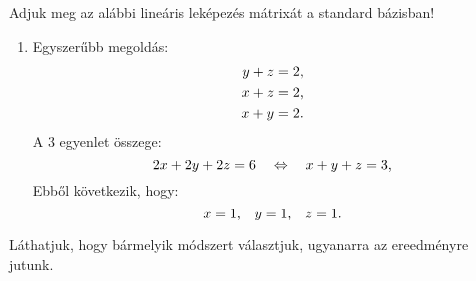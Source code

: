 \documentclass[exercise]{math-standalone}
\begin{document}
\begin{exercise}{%
    Adjuk meg az alábbi lineáris leképezés mátrixát a standard bázisban!
  }
{\begin{enumerate}[a)]
\begin{enumerate}[1)]
\begin{enumerate}
                      \item Egyszerűbb megoldás:
                            \begin{align*}
                              y + z & = 2 \text, \\
                              x + z & = 2 \text, \\
                              x + y & = 2 \text.
                            \end{align*}
                            A 3 egyenlet összege:
                            \[
                              2x + 2y + 2z = 6 \quad \Leftrightarrow \quad x + y + z = 3 \text,
                            \]
                            Ebből következik, hogy:
                            \[
                              x = 1 \text, \quad y = 1 \text, \quad z = 1 \text.
                            \]
                    \end{enumerate}
            \end{enumerate}
            Láthatjuk, hogy bármelyik módszert választjuk, ugyanarra az
            ereedményre jutunk.
    \end{enumerate}
  }
\end{exercise}
\end{document}
